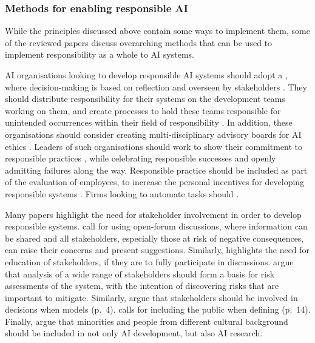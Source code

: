 \subsubsection{Methods for enabling responsible AI}
While the principles discussed above contain some ways to implement them, some of the reviewed papers discuss overarching methods that can be used to implement responsibility as a whole to AI systems.

AI organisations looking to develop responsible AI systems should adopt a , where decision-making is based on reflection and overseen by stakeholders \parencite{Morley_2021}. They should distribute responsibility for their systems on the development teams working on them, and create processes to hold these teams responsible for unintended occurrences within their field of responsibility \parencite{Rakova_2021}. In addition, these organisations should consider creating multi-disciplinary advisory boards for AI ethics \parencite{WangY_2020,Lu_2022}. Leaders of such organisations should work to show their commitment to responsible practices \parencite{Papagiannidis_2022}, while celebrating responsible successes \parencite{Lu_2022} and openly admitting failures \parencite{Rakova_2021} along the way. Responsible practice should be included as part of the evaluation of employees, to increase the personal incentives for developing responsible systems \parencite{Rakova_2021}. Firms looking to automate tasks should  \parencite[p.~827]{Wright_2018}.

Many papers highlight the need for stakeholder involvement in order to develop responsible systems. \textcite{Buhmann_2021} call for using open-forum discussions, where information can be shared and all stakeholders, especially those at risk of negative consequences, can raise their concerns and present suggestions. Similarly, \textcite{Dignum_2019,Dignum_2017} highlights the need for education of stakeholders, if they are to fully participate in discussions. \textcite{Clarke_2019,Havrda_2020} argue that analysis of a wide range of stakeholders should form a basis for risk assessments of the system, with the intention of discovering risks that are important to mitigate. Similarly, \textcite{Dignum_2021} argue that stakeholders should be involved in decisions when models  (p.~4). \textcite{Gianni_2022} calls for including the public when defining  (p.~14). Finally, \textcite{Lukkien_2021} argue that minorities and people from different cultural background should be included in not only AI development, but also AI research.


